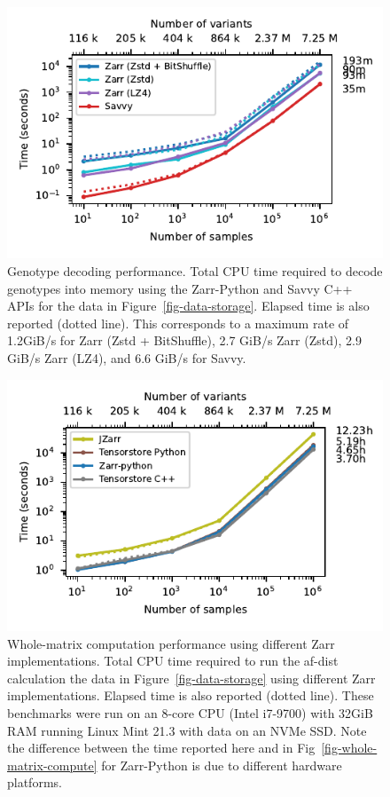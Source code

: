 \documentclass[a4paper,num-refs]{oup-contemporary}
\begin{document}
\begin{figure}[h]
\includegraphics{figures/whole-matrix-decode}
\caption{Genotype decoding performance.
Total CPU time required to decode genotypes into memory using the Zarr-Python
and Savvy C++ APIs for the data in Figure~\ref{fig-data-storage}.
Elapsed time is also reported (dotted line).
This corresponds to a maximum rate of 1.2GiB/s for Zarr (Zstd + BitShuffle),
2.7 GiB/s Zarr (Zstd), 2.9 GiB/s Zarr (LZ4), and 6.6 GiB/s for Savvy.
\label{fig-whole-matrix-decode}}
\end{figure}

\begin{figure}[h]
\includegraphics{figures/whole-matrix-compute-zarr-versions}
\caption{Whole-matrix computation performance using different Zarr
implementations.
Total CPU time required to run the af-dist calculation
the data in Figure~\ref{fig-data-storage} using different Zarr implementations.
Elapsed time is also reported (dotted line).
These benchmarks were run on an 8-core CPU (Intel i7-9700) with 32GiB RAM running
Linux Mint 21.3 with data on an NVMe SSD.
Note the difference between the
time reported here and in Fig~\ref{fig-whole-matrix-compute} for Zarr-Python
is due to different hardware platforms.
\label{fig-whole-matrix-compute-zarr-versions}}
\end{figure}
\end{document}
